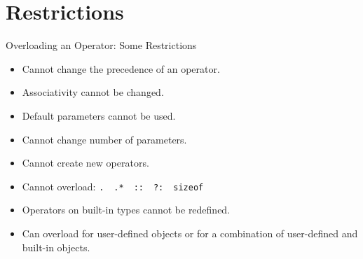 \documentclass[14pt,aspectratio=1610, hyperref={pdfpagelayout=SinglePage}]{beamer}
\begin{document}
\section*{Restrictions}
\begin{frame}[fragile]{Overloading an Operator: Some Restrictions}
\begin{itemize}[<+->]
\item
  Cannot change the precedence of an operator.
\item
  Associativity cannot be changed.
\item
  Default parameters cannot be used.
\item
  Cannot change number of parameters.
\item
  Cannot create new operators.
\item
  Cannot overload: \lstinline{.}~~\lstinline{.*}~~\lstinline{::}~~\lstinline{?:}~~\lstinline{sizeof}
\item
  Operators on built-in types cannot be redefined.
\item
  Can overload for user-defined objects or for a combination of
  user-defined and built-in objects.
\end{itemize}
\end{frame}



\end{document}
